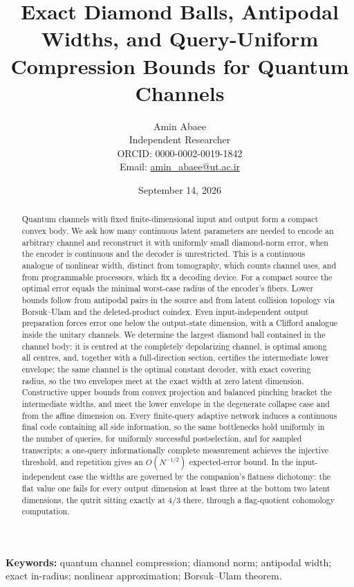 \documentclass[11pt,a4paper]{article}
\title{Exact Diamond Balls, Antipodal Widths, and Query-Uniform Compression Bounds for Quantum Channels}
\author{Amin Abaee\\
\small Independent Researcher\\
\small ORCID: 0000-0002-0019-1842\\
\small Email: \href{mailto:amin\_abaee@ut.ac.ir}{amin\_abaee@ut.ac.ir}}
\date{September 14, 2026}
\theoremstyle{definition}
\theoremstyle{plain}
\theoremstyle{remark}
\begin{document}
\maketitle

\begin{abstract}
Quantum channels with fixed finite-dimensional input and output form a compact convex body. We ask how many continuous latent parameters are needed to encode an arbitrary channel and reconstruct it with uniformly small diamond-norm error, when the encoder is continuous and the decoder is unrestricted. This is a continuous analogue of nonlinear width, distinct from tomography, which counts channel uses, and from programmable processors, which fix a decoding device. For a compact source the optimal error equals the minimal worst-case radius of the encoder's fibers. Lower bounds follow from antipodal pairs in the source and from latent collision topology via Borsuk--Ulam and the deleted-product coindex. Even input-independent output preparation forces error one below the output-state dimension, with a Clifford analogue inside the unitary channels. We determine the largest diamond ball contained in the channel body: it is centred at the completely depolarizing channel, is optimal among all centres, and, together with a full-direction section, certifies the intermediate lower envelope; the same channel is the optimal constant decoder, with exact covering radius, so the two envelopes meet at the exact width at zero latent dimension. Constructive upper bounds from convex projection and balanced pinching bracket the intermediate widths, and meet the lower envelope in the degenerate collapse case and from the affine dimension on. Every finite-query adaptive network induces a continuous final code containing all side information, so the same bottlenecks hold uniformly in the number of queries, for uniformly successful postselection, and for sampled transcripts; a one-query informationally complete measurement achieves the injective threshold, and repetition gives an $O(N^{-1/2})$ expected-error bound. In the input-independent case the widths are governed by the companion's flatness dichotomy: the flat value one fails for every output dimension at least three at the bottom two latent dimensions, the qutrit sitting exactly at $4/3$ there, through a flag-quotient cohomology computation.
\end{abstract}

\noindent\textbf{Keywords:} quantum channel compression; diamond norm; antipodal width; exact in-radius; nonlinear approximation; Borsuk--Ulam theorem.
\end{document}
